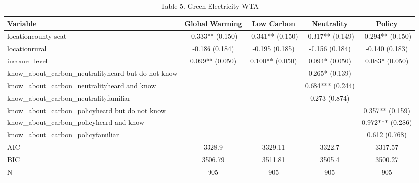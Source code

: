 \begin{table}[!htbp]
\centering
\caption{Table 5. Green Electricity WTA}
\begin{tabular}{lcccc}
\hline
Variable & Global Warming & Low Carbon & Neutrality & Policy \\
\hline
locationcounty seat & -0.333** (0.150) & -0.341** (0.150) & -0.317** (0.149) & -0.294** (0.150) \\
locationrural & -0.186 (0.184) & -0.195 (0.185) & -0.156 (0.184) & -0.140 (0.183) \\
income\_level & 0.099** (0.050) & 0.100** (0.050) & 0.094* (0.050) & 0.083* (0.050) \\
know\_about\_carbon\_neutralityheard but do not know &  &  & 0.265* (0.139) &  \\
know\_about\_carbon\_neutralityheard and know &  &  & 0.684*** (0.244) &  \\
know\_about\_carbon\_neutralityfamiliar &  &  & 0.273 (0.874) &  \\
know\_about\_carbon\_policyheard but do not know &  &  &  & 0.357** (0.159) \\
know\_about\_carbon\_policyheard and know &  &  &  & 0.972*** (0.286) \\
know\_about\_carbon\_policyfamiliar &  &  &  & 0.612 (0.768) \\
AIC & 3328.9 & 3329.11 & 3322.7 & 3317.57 \\
BIC & 3506.79 & 3511.81 & 3505.4 & 3500.27 \\
N & 905 & 905 & 905 & 905 \\
\hline
\end{tabular}
\end{table}
